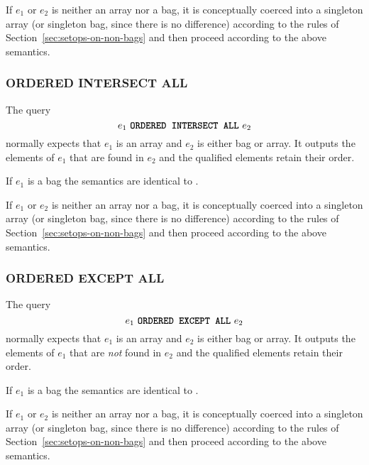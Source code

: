 {If $e_1$ or $e_2$ is neither an array nor a bag, it is conceptually coerced into
a singleton array (or singleton bag, since there is no difference) according to
the rules of Section~\ref{sec:setops-on-non-bags} and then proceed according to
the above semantics.

\subsubsection{ORDERED INTERSECT ALL}
\label{sec:ordered-intersect}
The query 
\[e_1\ \texttt{\textbf{ORDERED INTERSECT ALL}}\ e_2\] \noindent normally expects that $e_1$
is an array and $e_2$ is either bag or array. It outputs the elements of $e_1$
that are found in $e_2$ and the qualified elements retain their order.

If $e_1$ is a bag the semantics are identical to .

If $e_1$ or $e_2$ is neither an array nor a bag, it is conceptually coerced into
a singleton array (or singleton bag, since there is no difference) according to
the rules of Section~\ref{sec:setops-on-non-bags} and then proceed according to
the above semantics.

\subsubsection{ORDERED EXCEPT ALL}
\label{sec:ordered-except}
The query 
\[e_1\ \gl{ORDERED EXCEPT ALL}\ e_2\] \noindent normally expects that $e_1$ is
an array and $e_2$ is either bag or array. It outputs the elements of $e_1$ that
are \textit{not} found in $e_2$ and the qualified elements retain their order.

If $e_1$ is a bag the semantics are identical to .

If $e_1$ or $e_2$ is neither an array nor a bag, it is conceptually coerced into
a singleton array (or singleton bag, since there is no difference) according to
the rules of Section~\ref{sec:setops-on-non-bags} and then proceed according to
the above semantics.

}

